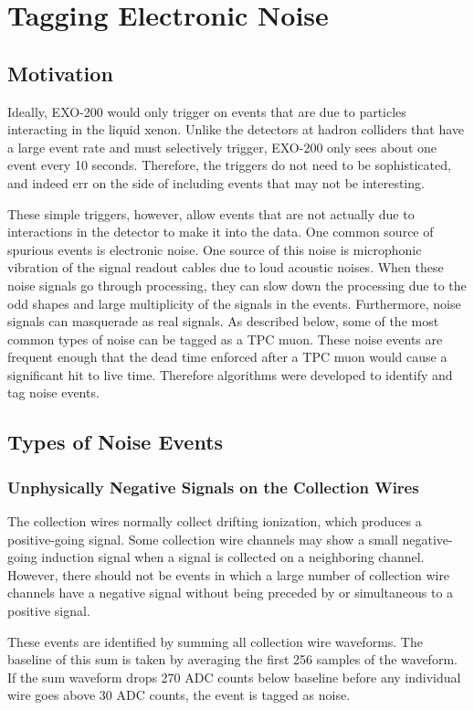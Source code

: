 \documentclass[herrin-thesis.tex]{subfiles}
\begin{document}
\chapter{Tagging Electronic Noise}
\label{app:noisetagger}

\section{Motivation}
Ideally, EXO-200 would only trigger on events that are due to particles interacting in the liquid xenon. Unlike the detectors at hadron colliders that have a large event rate and must selectively trigger, EXO-200 only sees about one event every 10 seconds. Therefore, the triggers do not need to be sophisticated, and indeed err on the side of including events that may not be interesting.

These simple triggers, however, allow events that are not actually due to interactions in the detector to make it into the data. One common source of spurious events is electronic noise. One source of this noise is microphonic vibration of the signal readout cables due to loud acoustic noises. When these noise signals go through processing, they can slow down the processing due to the odd shapes and large multiplicity of the signals in the events. Furthermore, noise signals can masquerade as real signals. As described below, some of the most common types of noise can be tagged as a TPC muon. These noise events are frequent enough that the dead time enforced after a TPC muon would cause a significant hit to live time. Therefore algorithms were developed to identify and tag noise events.

\section{Types of Noise Events}
\subsection{Unphysically Negative Signals on the Collection Wires}
The collection wires normally collect drifting ionization, which produces a positive-going signal. Some collection wire channels may show a small negative-going induction signal when a signal is collected on a neighboring channel. However, there should not be events in which a large number of collection wire channels have a negative signal without being preceded by or simultaneous to a positive signal.

These events are identified by summing all collection wire waveforms. The baseline of this sum is taken by averaging the first 256 samples of the waveform. If the sum waveform drops 270 ADC counts below baseline before any individual wire goes above 30 ADC counts, the event is tagged as noise.
\end{document}
